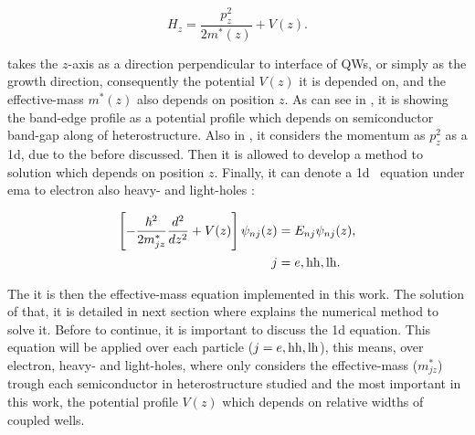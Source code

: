 \begin{equation}\label{eqn:chapter-2-sec-numerical-calculations-ema-hamiltonian}
	H_{z} = \dfrac{p_{z}^{2}}{2m^{*}(z)}+V(z).
\end{equation}

 takes the $z$-axis as a direction perpendicular to interface of QWs, or simply as the growth direction, consequently the potential $V(z)$ it is depended on, and the effective-mass $m^{*}(z)$ also depends on position $z$. As can see in , it is showing the band-edge profile as a potential profile which depends on semiconductor band-gap along of heterostructure.  Also in , it considers the momentum as $p_{z}^{2}$ as a \gls{1d}, due to the before discussed. Then it is allowed to develop a method to solution which depends on position $z$. Finally, it can denote a \gls{1d} \sch\, equation under \gls{ema} to electron also heavy- and light-holes : 

\begin{equation}\label{eqn:chapter-2-sec-numerical-calculations-ema-schrodinger}
	\begin{split}
	\left[-\dfrac{\hbar^2}{2m_{jz}^{*}}\dfrac{d^2}{dz^2}+V(z) \right]\psi_{nj}(z)&= E_{nj}\psi_{nj}(z),\\
	                                                               j&=e,\mathrm{hh},\mathrm{lh}.
	\end{split}
\end{equation}

The  it is then the effective-mass equation implemented in this work. The solution of that, it is detailed in next section where explains the numerical method to solve it. Before to continue, it is important to discuss the \gls{1d} equation. This equation will be applied over each particle ($j=e,\mathrm{hh},\mathrm{lh}$), this means, over electron, heavy- and light-holes, where only considers the effective-mass ($m_{jz}^{*}$) trough each semiconductor in heterostructure studied and the most important in this work, the potential profile $V(z)$ which depends on relative widths of coupled wells. 


